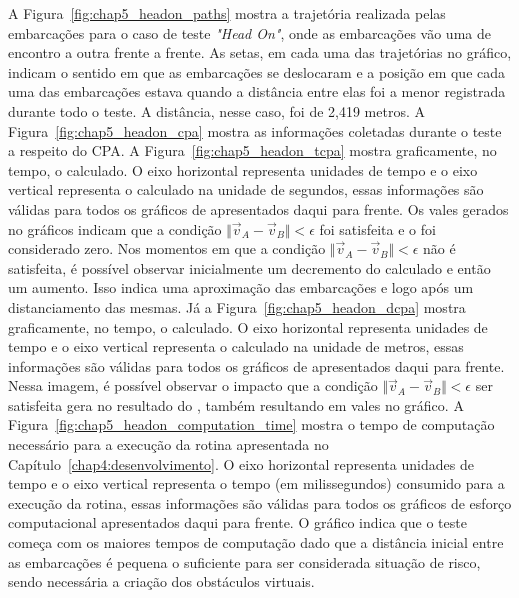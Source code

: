         A Figura~\ref{fig:chap5_headon_paths} mostra a trajetória realizada pelas embarcações para o caso de teste \textit{"Head On"}, onde as embarcações vão uma de encontro a outra frente a frente. As  setas, em cada uma das trajetórias no gráfico, indicam o sentido em que as embarcações se deslocaram e a posição em que cada uma das embarcações estava quando a distância entre elas foi a menor registrada durante todo o teste. A 
        distância, nesse caso, foi de 2,419 metros. A Figura~\ref{fig:chap5_headon_cpa} mostra as informações coletadas durante o teste a respeito do CPA. A Figura~\ref{fig:chap5_headon_tcpa} mostra graficamente, no tempo, o \tcpa calculado. O eixo horizontal representa unidades de tempo e o eixo vertical representa o \tcpa calculado na unidade de segundos, essas informações são válidas para todos os gráficos de \tcpa apresentados daqui para frente. Os vales gerados no gráficos indicam que a condição $\Vert\vec{v}_{A}-\vec{v}_{B}\Vert < \epsilon$ foi satisfeita e o \tcpa foi considerado zero. Nos momentos em que a 
        condição $\Vert\vec{v}_{A}-\vec{v}_{B}\Vert < \epsilon$ não é satisfeita, é possível observar inicialmente um decremento do \tcpa calculado e então um aumento. Isso indica uma aproximação das embarcações e logo após um distanciamento das mesmas.
        Já a Figura~\ref{fig:chap5_headon_dcpa} mostra graficamente, no tempo, o \dcpa calculado. O eixo horizontal representa unidades de tempo e o eixo vertical representa o \dcpa calculado na unidade de metros, essas informações são válidas para todos os gráficos de \dcpa apresentados daqui para frente. Nessa imagem, é possível observar o impacto que a condição $\Vert\vec{v}_{A}-\vec{v}_{B}\Vert < \epsilon$ ser satisfeita gera no resultado do \dcpa, também resultando em vales no gráfico. A Figura~\ref{fig:chap5_headon_computation_time} mostra o tempo de computação necessário para a execução da rotina apresentada no 
        Capítulo~\ref{chap4:desenvolvimento}. O eixo horizontal representa unidades de tempo e o eixo vertical representa o tempo (em milissegundos) consumido para a execução da rotina, essas informações são válidas para todos os gráficos de esforço computacional apresentados daqui para frente. O gráfico indica que o teste começa com os maiores tempos de computação dado que a distância inicial entre as embarcações é pequena o suficiente para ser considerada situação de risco, sendo necessária a criação dos obstáculos virtuais.
        
        

